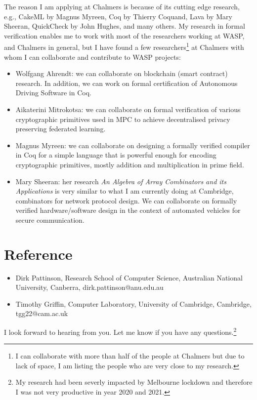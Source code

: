 \documentclass[11pt,a4paper,roman]{moderncv}
\begin{document}
The reason I am applying at Chalmers is because of its cutting edge research, 
e.g., CakeML by Magnus Myreen, Coq by Thierry Coquand, Lava by Mary Sheeran, 
QuickCheck by John Hughes, and many others. My research in formal verification 
enables me to work with most of the researchers working at WASP, and Chalmers in 
general, but I have found a few researchers\footnote{I can collaborate with 
more than half of the people at Chalmers but due to lack of space, I am listing the people who
are very close to my research.} at Chalmers with whom I can collaborate 
and contribute to WASP projects:
\begin{itemize}
  \item Wolfgang Ahrendt: we can collaborate on blockchain (smart contract) research.
    In addition, we can work on formal certification of Autonomous Driving Software in Coq. 
  \item Aikaterini Mitrokotsa: we can collaborate on formal verification of 
    various cryptographic primitives used in MPC to achieve decentralised
    privacy preserving federated learning.
  \item Magnus Myreen: we can collaborate on designing a formally verified 
    compiler in Coq for a simple language that is  powerful enough for encoding 
    cryptographic primitives, mostly addition and multiplication in prime field.
  \item Mary Sheeran: her research \textit{An Algebra of Array Combinators and its Applications}
   is very similar to what I am currently doing at Cambridge, combinators for 
   network protocol design. We can collaborate on formally verified hardware/software  
   design in the context of automated vehicles for secure communication.
    
\end{itemize}

\section{Reference}
\begin{itemize}
  \item Dirk Pattinson, Research School of Computer Science, Australian National University, Canberra, dirk.pattinson@anu.edu.au
  \item Timothy Griffin, Computer Laboratory,  University of Cambridge, Cambridge, tgg22@cam.ac.uk
\end{itemize}


\vspace{0.5cm}
I look forward to hearing from you. Let me know if you have any 
questions.\footnote{My research had been severly impacted by Melbourne lockdown and therefore
I was not very productive in year 2020 and 2021.} \\
 

\vspace{0.5cm}


\makeletterclosing
\end{document}
